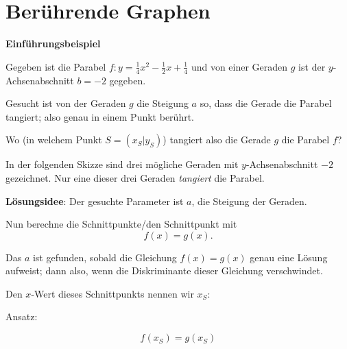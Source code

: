 \section{Berührende Graphen}

\textbf{Einführungsbeispiel}


Gegeben ist die Parabel $f: y=\frac{1}{4}x^2 -\frac12x +\frac14$ und von einer
Geraden $g$ ist der $y$-Achsenabschnitt $b = -2$ gegeben.

Gesucht ist von der Geraden $g$ die Steigung $a$ so, dass die
Gerade die Parabel tangiert; also genau in einem Punkt berührt.

Wo (in welchem Punkt $S=(x_S|y_S)$) tangiert also die Gerade $g$ die Parabel $f$?

In der folgenden Skizze sind drei mögliche Geraden mit $y$-Achsenabschnitt
$-2$ gezeichnet. Nur eine dieser drei Geraden \textit{tangiert} die Parabel.

\newpage
\textbf{Lösungsidee}: Der gesuchte Parameter ist $a$, die Steigung der
Geraden.

Nun berechne die Schnittpunkte/den Schnittpunkt mit $$f(x) = g(x).$$

Das $a$ ist gefunden, sobald die Gleichung $f(x)=g(x)$ genau eine
Lösung aufweist; dann also, wenn die Diskriminante dieser Gleichung
verschwindet.

Den $x$-Wert dieses Schnittpunkts nennen wir $x_S$:


Ansatz:

$$f(x_S) = g(x_S)$$


